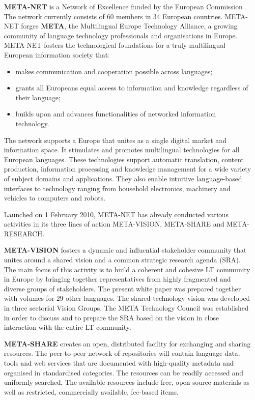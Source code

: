 \documentclass[10pt, plain]{../../metanetpaper}
\begin{document}
\begin{multicols}{2}
\textbf{META-NET} is a Network of Excellence funded by the European Commission \cite{rehm2011}.  The network currently consists of 60 members in 34 European countries. META-NET forges \textbf{META}, the Multilingual Europe Technology Alliance, a growing community of language technology professionals and organisations in Europe. META-NET fosters the technological foundations for a truly multilingual European information society that:

\begin{itemize}
\item makes communication and cooperation possible across languages;
\item grants all Europeans equal access to information and knowledge regardless of their language; 
\item builds upon and advances functionalities of networked information technology.
\end{itemize}

The network supports a Europe that unites as a single digital market and information space. It stimulates and promotes multilingual technologies for all European languages. These technologies support automatic translation, content production, information processing and knowledge management for a wide variety of subject domains and applications. They also enable intuitive language-based interfaces to technology ranging from household electronics, machinery and vehicles to computers and robots.

Launched on 1 February 2010, META-NET has already conducted various activities in its three lines of action META-VISION, META-SHARE and META-RESEARCH. 

\textbf{META-VISION} fosters a dynamic and influential stakeholder community that unites around a shared vision and a common strategic research agenda (SRA). The main focus of this activity is to build a coherent and cohesive LT community in Europe by bringing together representatives from highly fragmented and diverse groups of stakeholders. The present white paper was prepared together with volumes for 29 other languages. The shared technology vision was developed in three sectorial Vision Groups. The META Technology Council was established in order to discuss and to prepare the SRA based on the vision in close interaction with the entire LT community.

\textbf{META-SHARE} creates an open, distributed facility for exchanging and sharing resources. The peer-to-peer network of repositories will contain language data, tools and web services that are documented with high-quality metadata and organised in standardised categories. The resources can be readily accessed and uniformly searched. The available resources include free, open source materials as well as restricted, commercially available, fee-based items. 


\end{multicols}
\end{document}
